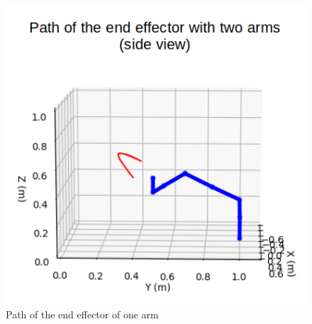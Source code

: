 \documentclass[a4paper, 10pt, conference]{ieeeconf}      %
\begin{document}
\begin{figure}[H]
	\includegraphics[scale=0.25]{images/two_arms_side.png}
	\caption{Path of the end effector of one arm}
	\label{fig:two_arm_avoidance}
\end{figure}
\end{document}
